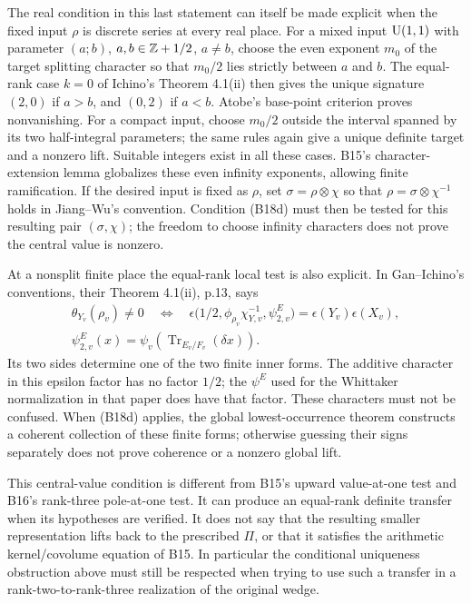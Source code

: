 \documentclass[11pt]{article}
\theoremstyle{definition}\newtheorem{definition}[theorem]{Definition}\newtheorem{remark}[theorem]{Remark}
\begin{document}
The real condition in this last statement can itself be made
explicit when the fixed input $\rho$ is discrete series at every
real place. For a mixed input $\operatorname{U}(1,1)$ with parameter $(a;b)$,
$a,b\in\mathbb Z+1/2$, $a\ne b$, choose the even exponent $m_0$ of
the target splitting character so that $m_0/2$ lies strictly
between $a$ and $b$. The equal-rank case $k=0$ of Ichino's
Theorem 4.1(ii) then gives the unique signature $(2,0)$ if
$a>b$, and $(0,2)$ if $a<b$. Atobe's base-point criterion
proves nonvanishing. For a compact input, choose $m_0/2$
outside the interval spanned by its two half-integral parameters;
the same rules again give a unique definite target and a
nonzero lift. Suitable integers exist in all these cases.
B15's character-extension lemma globalizes these even infinity
exponents, allowing finite ramification. If the desired input
is fixed as $\rho$, set $\sigma=\rho\otimes\chi$ so that
$\rho=\sigma\otimes\chi^{-1}$ holds in Jiang--Wu's convention.
Condition (B18d) must then be tested for this resulting pair
$(\sigma,\chi)$; the freedom to choose infinity characters
does not prove the central value is nonzero.

At a nonsplit finite place the equal-rank local test is also
explicit. In Gan--Ichino's conventions, their Theorem 4.1(ii),
p.13, says
\[
 \begin{gathered}
 \theta_{Y_v}(\rho_v)\ne0
 \quad\Longleftrightarrow\quad
 \epsilon\bigl(1/2,\phi_{\rho_v}\chi_{Y,v}^{-1},
                      \psi_{2,v}^E\bigr)
               =\epsilon(Y_v)\epsilon(X_v),\\
 \psi_{2,v}^E(x)=\psi_v(\operatorname{Tr}_{E_v/F_v}(\delta x)).
 \end{gathered}
 \tag{B18e}
\]
Its two sides determine one of the two finite inner forms.
The additive character in this epsilon factor has no factor
$1/2$; the $\psi^E$ used for the Whittaker normalization in
that paper does have that factor. These characters must not be
confused. When (B18d) applies, the global lowest-occurrence
theorem constructs a coherent collection of these finite forms;
otherwise guessing their signs separately does not prove
coherence or a nonzero global lift.

This central-value condition is different from B15's upward
value-at-one test and B16's rank-three pole-at-one test. It can
produce an equal-rank definite transfer when its hypotheses are
verified. It does not say that the resulting smaller
representation lifts back to the prescribed $\Pi$, or that it
satisfies the arithmetic kernel/covolume equation of B15.
In particular the conditional uniqueness obstruction above
must still be respected when trying to use such a transfer in
a rank-two-to-rank-three realization of the original wedge.
\end{document}
